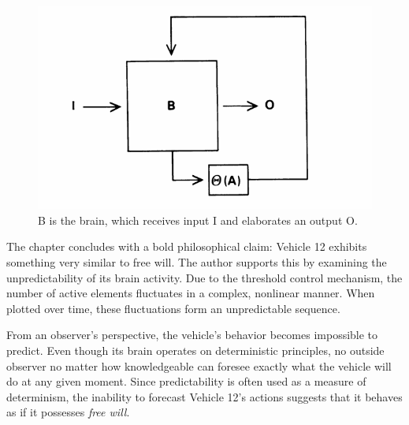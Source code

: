 \documentclass{article}
\begin{document}
	\begin{figure}[h]
		\centering
		\includegraphics[scale=0.5]{images/figure-18.png}
		\caption{B is the brain, which receives input I and elaborates an output O.}
		\label{fig:vehicle-18}
	\end{figure}

	The chapter concludes with a bold philosophical claim: Vehicle 12 exhibits something very similar to free will. The author supports this by examining the unpredictability of its brain activity. Due to the threshold control mechanism, the number of active elements fluctuates in a complex, nonlinear manner. When plotted over time, these fluctuations form an unpredictable sequence.  

	From an observer's perspective, the vehicle's behavior becomes impossible to predict. Even though its brain operates on deterministic principles, no outside observer no matter how knowledgeable can foresee exactly what the vehicle will do at any given moment. Since predictability is often used as a measure of determinism, the inability to forecast Vehicle 12's actions suggests that it behaves as if it possesses \textit{free will}.  
\end{document}
